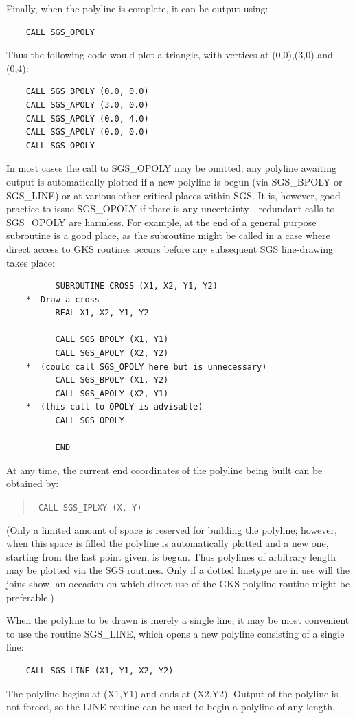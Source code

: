 \documentclass[11pt]{article}
\newcommand{\htmlref}[2]{#1}
\begin{document}
Finally, when the polyline is complete, it can be
output using:
\begin{verbatim}
    CALL SGS_OPOLY
\end{verbatim}
Thus the following code
would plot a triangle, with vertices
at (0,0),(3,0) and (0,4):
\begin{verbatim}
    CALL SGS_BPOLY (0.0, 0.0)
    CALL SGS_APOLY (3.0, 0.0)
    CALL SGS_APOLY (0.0, 4.0)
    CALL SGS_APOLY (0.0, 0.0)
    CALL SGS_OPOLY
\end{verbatim}
In most cases the call to SGS\_OPOLY may be omitted;  any polyline
awaiting output is automatically plotted if a
new polyline is begun (via SGS\_BPOLY or
\htmlref{SGS\_LINE}{SGS_LINE}) or at
various other critical places within SGS.
It is, however, good practice to issue SGS\_OPOLY if there is
any uncertainty---redundant calls to
SGS\_OPOLY are harmless.  For example, at the end of a general purpose
subroutine is a good
place, as the subroutine might be called in a case where
direct access to GKS routines occurs before any
subsequent SGS line-drawing takes place:
\begin{verbatim}
          SUBROUTINE CROSS (X1, X2, Y1, Y2)
    *  Draw a cross
          REAL X1, X2, Y1, Y2

          CALL SGS_BPOLY (X1, Y1)
          CALL SGS_APOLY (X2, Y2)
    *  (could call SGS_OPOLY here but is unnecessary)
          CALL SGS_BPOLY (X1, Y2)
          CALL SGS_APOLY (X2, Y1)
    *  (this call to OPOLY is advisable)
          CALL SGS_OPOLY

          END
\end{verbatim}

At any time, the current end coordinates of the polyline being
built can be obtained by:
\begin{quote}{\tt
    CALL \htmlref{SGS\_IPLXY}{SGS_IPLXY} (X, Y)}
\end{quote}
(Only a limited amount of space is reserved for building the
polyline;  however, when this space is filled the polyline is
automatically plotted and a new one, starting from the
last point given, is begun.  Thus polylines of arbitrary length may
be plotted via the SGS routines.  Only if a dotted linetype
are in use will the joins show, an occasion on
which direct use of the GKS polyline routine might be
preferable.)

When the polyline to be drawn is merely a single line, it may be most
convenient to use the routine SGS\_LINE, which opens a new polyline
consisting of a single line:
\begin{verbatim}
    CALL SGS_LINE (X1, Y1, X2, Y2)
\end{verbatim}
The polyline begins at (X1,Y1) and ends at (X2,Y2).  Output
of the polyline is not forced, so the LINE routine
can be used to begin a polyline of any length.
\end{document}
